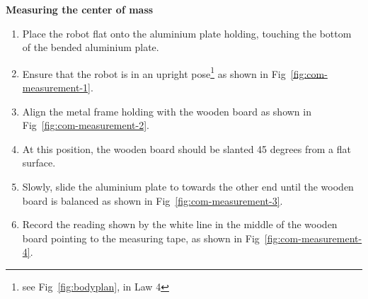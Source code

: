 \bigskip

{\bfseries Measuring the center of mass}

\headlinebox

\begin{enumerate}
\item Place the robot flat onto the aluminium plate holding,
  touching the bottom of the bended aluminium plate.
\item Ensure that the robot is in an upright pose\footnote{see
    Fig~\ref{fig:bodyplan}, in Law 4}
  as shown in Fig~\ref{fig:com-measurement-1}.
\item Align the metal frame holding with the wooden board as shown in
  Fig~\ref{fig:com-measurement-2}.
\item At this position, the wooden board should be slanted 45 degrees from a
  flat surface.
\item Slowly, slide the aluminium plate to towards the other end until the
  wooden board is balanced as shown in Fig~\ref{fig:com-measurement-3}.
\item Record the reading shown by the white line in the middle of the wooden
  board pointing to the measuring tape,
  as shown in Fig~\ref{fig:com-measurement-4}.
\end{enumerate}

